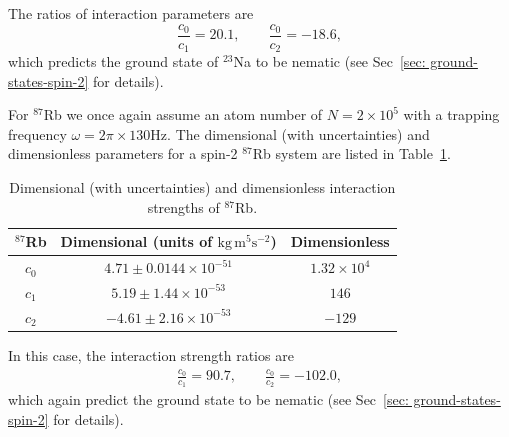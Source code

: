 The ratios of interaction parameters are
\begin{equation}
    \frac{c_0}{c_1} = 20.1, \qquad \frac{c_0}{c_2} = -18.6,
\end{equation}
which predicts the ground state of \( ^{23}\)Na to be nematic (see
Sec~\ref{sec: ground-states-spin-2} for details).

For \( ^{87}\)Rb we once again assume an atom number of \(N=2\times10^5\) with a
trapping frequency \(\omega = 2\pi \times 130\)Hz.
The dimensional (with uncertainties) and dimensionless parameters for a spin-2
\( ^{87}\)Rb system are listed in
Table~\ref{table: spin-2-interactions-rb87}.
\begin{table}[!htbp]
    \centering
    \begin{tabular}{ccc}
        \toprule
        \( ^{87}\)Rb & Dimensional (units of \(\text{kg}\, \text{m}^5
        \text{s}^{-2} \)) & Dimensionless \\
        \midrule
        \(c_0\) & \(4.71 \pm 0.0144 \times 10^{-51}\) & \(1.32\times10^4\) \\
        \(c_1\) & \(5.19 \pm 1.44 \times 10^{-53}\) & \(146\) \\
        \(c_2\) & \(-4.61 \pm 2.16 \times 10^{-53}\) & \(-129\) \\
        \bottomrule
    \end{tabular}
    \caption{\label{table: spin-2-interactions-rb87}Dimensional (with
    uncertainties) and dimensionless interaction strengths of \( ^{87}\)Rb.}
\end{table}
In this case, the interaction strength ratios are
\begin{align}
    \frac{c_0}{c_1} = 90.7, \qquad \frac{c_0}{c_2} = -102.0,
\end{align}
which again predict the ground state to be nematic (see
Sec~\ref{sec: ground-states-spin-2} for details).
